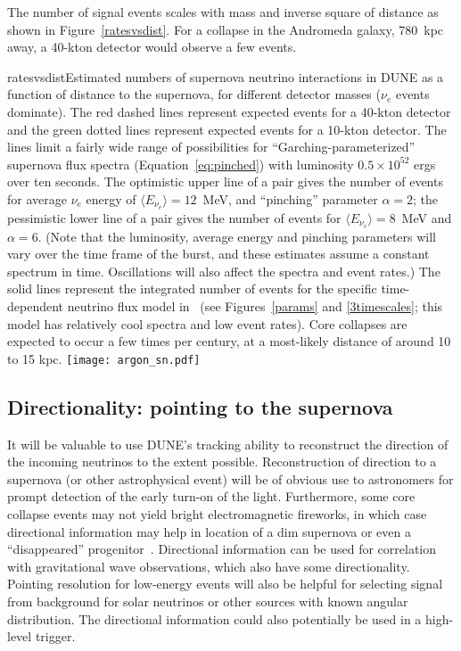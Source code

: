 The number of signal events scales with mass and inverse square of
distance as shown in Figure~\ref{ratesvsdist}.  For a collapse in the
Andromeda galaxy, 780~kpc away, a 40-kton detector would observe a few events.

\begin{dunefigure}{ratesvsdist}{Estimated numbers of supernova neutrino interactions in DUNE as a function of distance to the supernova, for different detector masses ($\nu_e$ events dominate). The red dashed lines represent expected events for a 40-kton detector and the green dotted lines represent expected events for a 10-kton detector. The lines limit a fairly wide range of possibilities for ``Garching-parameterized'' supernova flux spectra (Equation~\ref{eq:pinched}) with luminosity $0.5\times 10^{52}$ ergs over ten seconds. The optimistic upper line of a pair gives the number of events for average $\nu_e$ energy of $\langle E_{\nu_e}\rangle =12$~MeV, and ``pinching'' parameter $\alpha=2$; the pessimistic lower line of a pair gives the number of events for $\langle E_{\nu_e}\rangle=8$~MeV and $\alpha=6$. (Note that the luminosity, average energy and pinching parameters will vary over the time frame of the burst, and these estimates assume a constant spectrum in time. Oscillations will also affect the spectra and event rates.) The solid lines represent the integrated number of events for the specific time-dependent neutrino flux model in~\cite{Huedepohl:2009wh} (see Figures~\ref{params} and \ref{3timescales}; this model has relatively cool spectra and low event rates). Core collapses are expected to occur a few times per century, at a most-likely distance of around 10 to 15 kpc.}
\texttt{[image: argon\_sn.pdf]}
\end{dunefigure}


\subsection{Directionality: pointing to the supernova}\label{sec:pointing}



It will be valuable to use DUNE's tracking ability to reconstruct the direction of the incoming neutrinos to the extent possible.  Reconstruction of direction to a supernova (or other astrophysical event) will be of obvious use to astronomers for prompt detection of the early turn-on of the light.  Furthermore, some core collapse events may not yield bright electromagnetic fireworks, in which case directional information may help in location of a dim supernova or even a ``disappeared'' progenitor~\cite{Kochanek:2008mp}.
Directional information can be used for correlation with gravitational
wave observations, which also have some directionality.  Pointing
resolution for low-energy events will also be helpful for selecting
signal from background for solar neutrinos or other sources with known
angular distribution.  The directional information could also
potentially be used in a high-level trigger.

